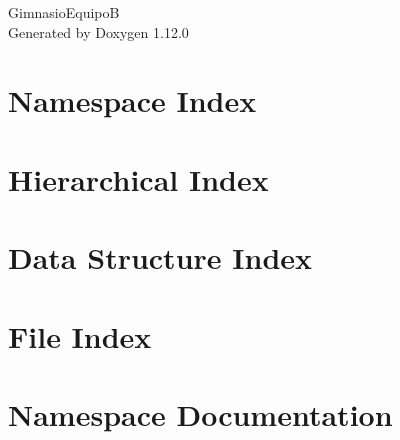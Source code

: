 \documentclass[twoside]{book}
\newcommand{\+}{\discretionary{\mbox{\scriptsize$\hookleftarrow$}}{}{}}
\newcommand{\clearemptydoublepage}{%
    \newpage{\pagestyle{empty}\cleardoublepage}%
  }
\begin{document}
  \raggedbottom
    \hypersetup{pageanchor=false,
                bookmarksnumbered=true,
                pdfencoding=unicode
               }
  \begin{titlepage}
  \vspace*{7cm}
  \begin{center}%
  {\Large Gimnasio\+EquipoB}\\
  \vspace*{1cm}
  {\large Generated by Doxygen 1.12.0}\\
  \end{center}
  \end{titlepage}
  \clearemptydoublepage
  \tableofcontents
  \clearemptydoublepage
  \hypersetup{pageanchor=true}




\chapter{Namespace Index}

\chapter{Hierarchical Index}

\chapter{Data Structure Index}

\chapter{File Index}

\chapter{Namespace Documentation}










\end{document}
